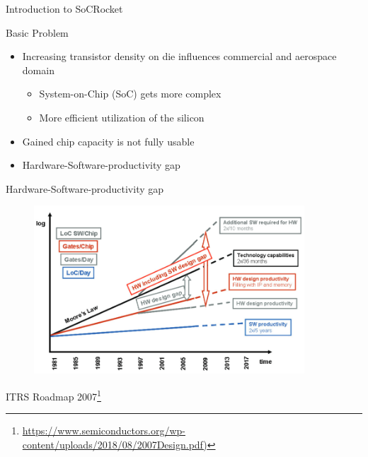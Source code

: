 \begin{frame}{Introduction to SoCRocket}
\begin{block}{Basic Problem}
  \begin{itemize}
		\item Increasing transistor density on die influences commercial and aerospace domain 
			\begin{itemize}
				\item System-on-Chip (SoC) gets more complex
				\item More efficient utilization of the silicon
			\end{itemize}
			\item Gained chip capacity is not fully usable
			\item Hardware-Software-productivity gap	
	\end{itemize}
\end{block}
\end{frame}

\begin{frame}{Hardware-Software-productivity gap}
	\begin{figure}
	\label{fig:prodgap}
	\centering
	\includegraphics[width=0.9\textwidth]{pictures/Productivity.PNG}
	\end{figure}
	ITRS Roadmap 2007\footnote{\url{https://www.semiconductors.org/wp-content/uploads/2018/08/2007Design.pdf)}}
\end{frame}


